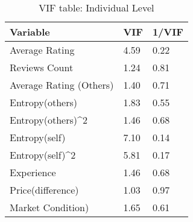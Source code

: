 \begin{table}[]
\centering
\begin{tabular}{@{}lll@{}}
\toprule
Variable                           & VIF  & 1/VIF \\ \midrule
Average Rating                     & 4.59 & 0.22  \\
Reviews Count                      & 1.24 & 0.81  \\
Average Rating (Others)            & 1.40 & 0.71  \\
Entropy(others)                    & 1.83 & 0.55  \\
Entropy(others)\textasciicircum{}2 & 1.46 & 0.68  \\
Entropy(self)                      & 7.10 & 0.14  \\
Entropy(self)\textasciicircum{}2   & 5.81 & 0.17  \\
Experience                         & 1.46 & 0.68  \\
Price(difference)                  & 1.03 & 0.97  \\
Market Condition)                  & 1.65 & 0.61  \\ \bottomrule
\end{tabular}
\caption{VIF table: Individual Level}
\label{vif_ind}
\end{table}